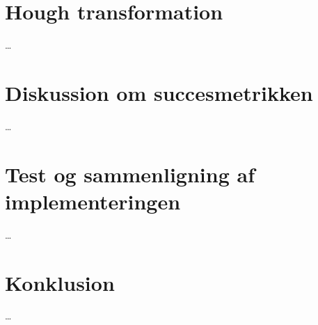 \documentclass[11pt,a4paper]{article}
\begin{document}
\section{Hough transformation}
\ldots

\section{Diskussion om succesmetrikken}
\ldots

\section{Test og sammenligning af implementeringen}
\ldots

\section{Konklusion}
\ldots



\end{document}

